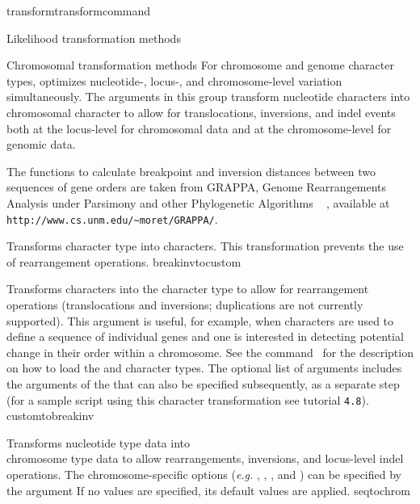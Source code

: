 \begin{command}{transform}{transformcommand}
\begin{arguments}
\begin{argumentgroup}{Likelihood transformation methods}
        \end{argumentgroup}


        \begin{argumentgroup}{Chromosomal transformation methods}
           For chromosome and genome character types, \poy optimizes nucleotide-, 
           locus-, and chromosome-level variation simultaneously. The arguments in this group
           transform nucleotide characters into chromosomal character
           to allow for translocations, inversions, and indel events both at the locus-level for chromosomal data
           and at the chromosome-level for genomic data.
           
          The functions to calculate breakpoint and inversion distances between two
	sequences of gene orders are taken from GRAPPA, Genome
	Rearrangements Analysis under Parsimony and other Phylogenetic Algorithms ~     \cite{baderetal2002},
	available at \texttt{http://www.cs.unm.edu/\~{}moret/GRAPPA/}.
	
            {Transforms  character type into  characters.
            This transformation prevents the use of rearrangement operations.} 
            {breakinvtocustom}

            {Transforms  characters into the  character type to 
            allow for rearrangement operations (translocations and inversions; duplications are not currently supported).  
            This argument is useful, for example, when  characters are used to define a sequence of
            individual genes and one is interested in detecting potential change in their order within a chromosome. 
            See the command~ for the description on how to load the  and  character types. The optional list of arguments
            includes the arguments of the  that can also
            be specified subsequently, as a separate step (for a sample script using this character transformation see tutorial \texttt{4.8}).}
            {customtobreakinv}
             
           {Transforms nucleotide type data into \\ chromosome type data to allow
            rearrangements, inversions, and locus-level indel operations.  The
            chromosome-specific options (\emph{e.g.}  , 
            , , and ) can be specified by the argument
             If no  values
           are specified, its default values are applied.}
           {seqtochrom}
           

\end{argumentgroup}
\end{arguments}
\end{command}
